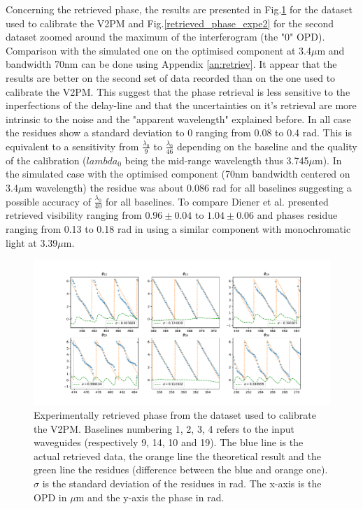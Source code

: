 Concerning the retrieved phase, the results are presented in Fig.\ref{fig:retrieved_phase_expe} for the dataset used to calibrate the V2PM and Fig.\ref{retrieved_phase_expe2} for the second dataset zoomed around the maximum of the interferogram (the "0" OPD). Comparison with the simulated one on the optimised component at 3.4$\mu$m and bandwidth 70nm can be done using Appendix \ref{an:retriev}. It appear that the results are better on the second set of data recorded than on the one used to calibrate the V2PM. This suggest that the phase retrieval is less sensitive to the inperfections of the delay-line and that the uncertainties on it's retrieval are more intrinsic to the noise and the "apparent wavelength" explained before. In all case the residues show a standard deviation to 0 ranging from 0.08 to 0.4 rad. This is equivalent to a sensitivity from $\frac{\lambda_0}{9}$ to $\frac{\lambda_0}{46}$ depending on the baseline and the quality of the calibration ($lambda_0$ being the mid-range wavelength thus 3.745$\mu$m). In the simulated case with the optimised component (70nm bandwidth centered on 3.4$\mu$m wavelength) the residue was about 0.086 rad for all baselines suggesting a possible accuracy of $\frac{\lambda_0}{40}$ for all baselines. To compare Diener et al. presented retrieved visibility ranging from $0.96\pm0.04$ to $1.04\pm0.06$ and phases residue ranging from 0.13 to 0.18 rad in \cite{Diener2017} using a similar component with monochromatic light at 3.39$\mu$m.  

\begin{figure}[htbp!]
 \centering
 \includegraphics[scale=.4]{../picture/retrieve_phase_expe1.pdf}
 \caption{Experimentally retrieved phase from the dataset used to calibrate the V2PM. Baselines numbering 1, 2, 3, 4 refers to the input waveguides (respectively  9, 14, 10 and 19). The blue line is the actual retrieved data, the orange line the theoretical result and the green line the residues (difference between the blue and orange one). $\sigma$ is the standard deviation of the residues in rad. The x-axis is the OPD in $\mu$m and the y-axis the phase in rad. }
 \label{fig:retrieved_phase_expe}
\end{figure}

